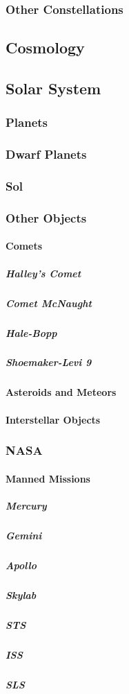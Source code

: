 \documentclass[12pt]{book}
\begin{document}
			\subsubsection{Other Constellations}
		
		
		\subsection{Cosmology}
		\subsection{Solar System}
			\subsubsection{Planets}
			\subsubsection{Dwarf Planets}
			\subsubsection{Sol}
			\subsubsection{Other Objects}
				\paragraph{Comets}
					\subparagraph{Halley's Comet}
					\subparagraph{Comet McNaught}
					\subparagraph{Hale-Bopp}
					\subparagraph{Shoemaker-Levi 9}
				\paragraph{Asteroids and Meteors}
				\paragraph{Interstellar Objects}
			
			\subsubsection{NASA}
				\paragraph{Manned Missions}
					\subparagraph{Mercury}
					\subparagraph{Gemini}
					\subparagraph{Apollo}
					\subparagraph{Skylab}
					\subparagraph{STS}
					\subparagraph{ISS}
					\subparagraph{SLS}
\end{document}
